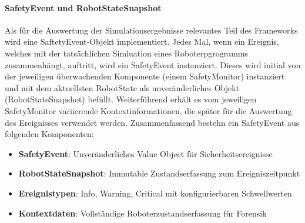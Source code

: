 \paragraph{SafetyEvent und RobotStateSnapshot}
Als für die Auswertung der Simulationsergebnisse relevantes Teil des Frameworks
wird eine SaftetyEvent-Objekt implementiert. Jedes Mal, wenn ein Ereignis,
welches mit der tatsächlichen Simluation eines Roboterpgrogramms zusammenhängt,
auftritt, wird ein SafetyEvent instanziert. Dieses wird initial von der
jeweiligen überwachenden Komponente (einem SafetyMonitor) instanziert und mit
dem aktuellsten RobotState als unveränderliches Objekt (RobotStateSnapshot) befüllt.
Weiterführend erhält es vom jeweiligen SafetyMonitor variierende
Kontextinformationen, die später für die Auswertung des Ereignisses verwendet
werden. Zusammenfassend bestehn ein SafetyEvent aus folgenden Komponenten:
\begin{itemize}
	\item \textbf{SafetyEvent}: Unveränderliches Value Object für Sicherheitsereignisse
	\item \textbf{RobotStateSnapshot}: Immutable Zustandserfassung zum Ereigniszeitpunkt
	\item \textbf{Ereignistypen}: Info, Warning, Critical mit konfigurierbaren Schwellwerten
	\item \textbf{Kontextdaten}: Vollständige Roboterzustandserfassung für Forensik
\end{itemize}
\noindent
